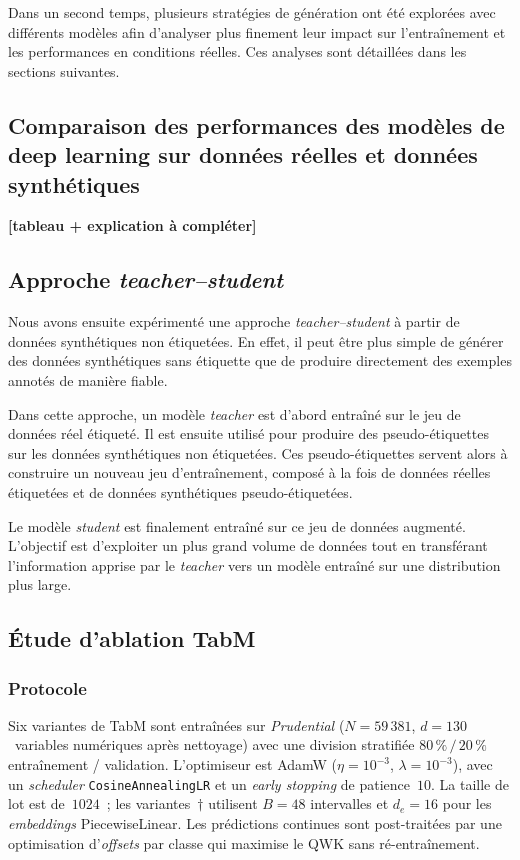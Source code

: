 \documentclass[conference]{IEEEtran}
\begin{document}
Dans un second temps, plusieurs stratégies de génération ont été explorées avec différents modèles afin d'analyser plus finement leur impact sur l'entraînement et les performances en conditions réelles. Ces analyses sont détaillées dans les sections suivantes.

\subsection{Comparaison des performances des modèles de deep learning sur données réelles et données synthétiques}


\textbf{[tableau + explication à compléter]}

\subsection{Approche \textit{teacher--student}}

Nous avons ensuite expérimenté une approche \textit{teacher--student} à partir de données synthétiques non étiquetées. En effet, il peut être plus simple de générer des données synthétiques sans étiquette que de produire directement des exemples annotés de manière fiable.

Dans cette approche, un modèle \textit{teacher} est d'abord entraîné sur le jeu de données réel étiqueté. Il est ensuite utilisé pour produire des pseudo-étiquettes sur les données synthétiques non étiquetées. Ces pseudo-étiquettes servent alors à construire un nouveau jeu d'entraînement, composé à la fois de données réelles étiquetées et de données synthétiques pseudo-étiquetées.

Le modèle \textit{student} est finalement entraîné sur ce jeu de données augmenté. L'objectif est d'exploiter un plus grand volume de données tout en transférant l'information apprise par le \textit{teacher} vers un modèle entraîné sur une distribution plus large.


\subsection{Étude d'ablation TabM}

\subsubsection{Protocole}
Six variantes de TabM sont entraînées sur \textit{Prudential} ($N=59\,381$, $d=130$~variables numériques après nettoyage) avec une division stratifiée $80\,\%\,/\,20\,\%$ entraînement / validation. L'optimiseur est AdamW ($\eta=10^{-3}$, $\lambda=10^{-3}$), avec un \textit{scheduler} \texttt{CosineAnnealingLR} et un \textit{early stopping} de patience~$10$. La taille de lot est de~$1024$~; les variantes~$\dagger$ utilisent $B=48$ intervalles et $d_e=16$ pour les \textit{embeddings} PiecewiseLinear. Les prédictions continues sont post-traitées par une optimisation d'\textit{offsets} par classe qui maximise le QWK sans ré-entraînement.
\end{document}
